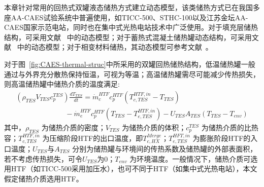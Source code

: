 本章针对常用的回热式双罐液态储热方式建立动态模型，该类储热方式已在我国多座AA-CAES试验系统中普遍使用，如TICC-500\cite{TICC-15}、STHC-100\cite{ST-CAES-17}以及江苏金坛AA-CAES国家示范电站\cite{CAES-Review-17-Rui-salt}，同时也在集中式光热电站技术中广泛使用\cite{TES-CSP-review-13}。对于填充层储热结构，可采用文献~ 中的动态模型；对于蓄热式混凝土储热罐动态结构，可采用文献~ 中的动态模型；对于相变材料储热，其动态模型可参考文献~。

对于图~\ref{fig:CAES-thermal-struc}中所采用的双罐回热储热结构，低温储热罐一般通过与外界充分散热保持恒温，可视为等温；高温储热罐需尽可能减少传热损失，则高温储热罐中储热介质的温度满足\cite{CAES-Wind-Rui-19}:
\begin{equation}
\label{equ:TES-HTF-temp}
\begin{array}{l}
({{\rho _{TES}}{V_{TES}}c_p^{TES}})\frac{{d{T_{TES}}}}{{dt}} = \dot m_c^{HTF}c_p^{HTF}({T_{c,TES}^{HTF,in} - {T_{TES}}})\\
\;\;\;\;\;\;\;\;\;\;\;\;\;\;\;\;\;\;\;\;\;\;\;\;\; - \dot m_e^{HTF}c_p^{HTF}({{T_{TES}} - T_{e,TES}^{HTF,in}}) - {U_{TES}}{A_{TES}}({{T_{TES}} - {T_{env}}})
\end{array}
\end{equation}
其中，${\rho _{TES}}$ 为储热介质的密度；${V_{TES}}$ 为储热介质的体积；$c_p^{TES}$ 为储热介质的比热容；$T_{c,TES}^{HTF,in}$ 为压缩阶段HTF的出口温度，即$T_{c,HX}^{Merge}$；$T_{e,TES}^{HFT,in}$ 为膨胀阶段HTF的入口温度；${U_{TES}}$与${A_{TES}}$ 分别为储热罐与环境间的传热系数及储热罐的外部表面积，若不考虑传热损失，可令${U_{TES}}$为0；$T_{env}$ 为环境温度。一般情况下，储热介质可选用HTF（如TICC-500采用加压水），也可不同于HTF（如集中式光热电站），本文假定储热介质选用HTF。

